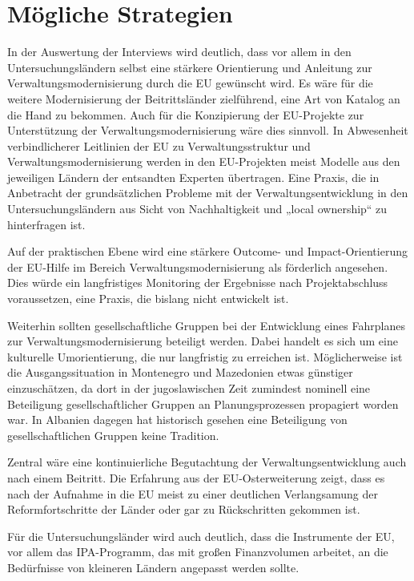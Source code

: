 \section{Mögliche Strategien }
In der Auswertung der Interviews wird deutlich, dass vor allem in den Untersuchungsländern selbst eine stärkere Orientierung und Anleitung zur Verwaltungsmodernisierung durch die EU gewünscht wird. Es wäre für die weitere Modernisierung der Beitrittsländer zielführend, eine Art von Katalog an die Hand zu bekommen. Auch für die Konzipierung der EU-Projekte zur Unterstützung der Verwaltungsmodernisierung wäre dies sinnvoll. In Abwesenheit verbindlicherer Leitlinien der EU zu Verwaltungsstruktur und Verwaltungsmodernisierung werden in den EU-Projekten meist Modelle aus den jeweiligen Ländern der entsandten Experten übertragen. Eine Praxis, die in Anbetracht der grundsätzlichen Probleme mit der Verwaltungsentwicklung in den Untersuchungsländern aus Sicht von Nachhaltigkeit und „local ownership“ zu hinterfragen ist.\par
Auf der praktischen Ebene wird eine stärkere Outcome- und Impact-Orientierung der EU-Hilfe im Bereich Verwaltungsmodernisierung als förderlich angesehen. Dies würde ein langfristiges Monitoring der Ergebnisse nach Projektabschluss voraussetzen, eine Praxis, die bislang nicht entwickelt ist.\par
Weiterhin sollten gesellschaftliche Gruppen bei der Entwicklung eines Fahrplanes zur Verwaltungsmodernisierung beteiligt werden. Dabei handelt es sich um eine kulturelle Umorientierung, die nur langfristig zu erreichen ist. Möglicherweise ist die Ausgangssituation in Montenegro und Mazedonien etwas günstiger einzuschätzen, da dort in der jugoslawischen Zeit zumindest nominell eine Beteiligung gesellschaftlicher Gruppen an Planungsprozessen propagiert worden war. In Albanien dagegen hat historisch gesehen eine Beteiligung von gesellschaftlichen Gruppen keine Tradition. \par
Zentral wäre eine kontinuierliche Begutachtung der Verwaltungsentwicklung auch nach einem Beitritt. Die Erfahrung aus der EU-Osterweiterung zeigt, dass es nach der Aufnahme in die EU meist zu einer deutlichen Verlangsamung der Reformfortschritte der Länder oder gar zu Rückschritten gekommen ist.\par
Für die Untersuchungsländer wird auch deutlich, dass die Instrumente der EU, vor allem das IPA-Programm, das mit großen Finanzvolumen arbeitet, an die Bedürfnisse von kleineren Ländern angepasst werden sollte. \par
